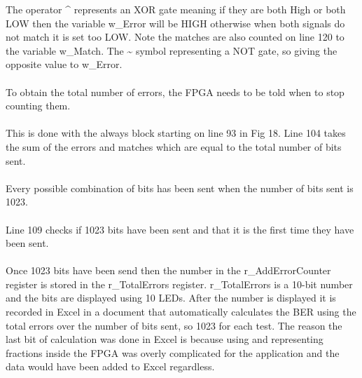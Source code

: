 \documentclass[conference]{IEEEtran}
\begin{document}
The operator \^{} represents an XOR gate meaning if they are both High or both LOW then the variable w\_Error will be HIGH otherwise when both signals do not match it is set too LOW. Note the matches are also counted on line 120 to the variable w\_Match. The \~{} symbol representing a NOT gate, so giving the opposite value to w\_Error.\\\\

To obtain the total number of errors, the FPGA needs to be told when to stop counting them. \\\\

This is done with the always block starting on line 93 in Fig 18. Line 104 takes the sum of the errors and matches which are equal to the total number of bits sent. \\\\

Every possible combination of bits has been sent when the number of bits sent is 1023. \\\\

Line 109 checks if 1023 bits have been sent and that it is the first time they have been sent.\\\\

Once 1023 bits have been send then the number in the r\_AddErrorCounter register is stored in the r\_TotalErrors register. r\_TotalErrors is a 10-bit number and the bits are displayed using 10 LEDs. After the number is displayed it is recorded in Excel in a document that automatically calculates the BER using the total errors over the number of bits sent, so 1023 for each test. The reason the last bit of calculation was done in Excel is because using and representing fractions inside the FPGA was overly complicated for the application and the data would have been added to Excel regardless. 
\end{document}
